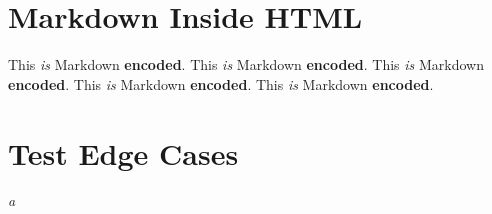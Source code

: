 
\def\mytitle{Markdown in HTML Test}
\def\latexmode{memoir}


\chapter{Markdown Inside HTML}
\label{markdowninsidehtml}
This \emph{is} Markdown \textbf{encoded}.
This \emph{is} Markdown \textbf{encoded}.
This \emph{is} Markdown \textbf{encoded}.
This \emph{is} Markdown \textbf{encoded}.
This \emph{is} Markdown \textbf{encoded}.

\chapter{Test Edge Cases}
\label{testedgecases}

\emph{a}





